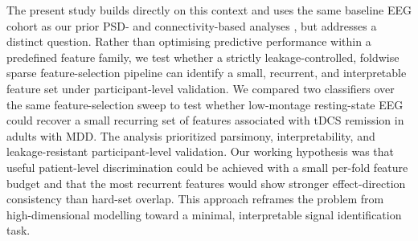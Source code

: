 The present study builds directly on this context and uses the same baseline EEG cohort as our prior PSD- and connectivity-based analyses \citep{Moncy2024,Xiao2025PMIP}, but addresses a distinct question. Rather than optimising predictive performance within a predefined feature family, we test whether a strictly leakage-controlled, foldwise sparse feature-selection pipeline can identify a small, recurrent, and interpretable feature set under participant-level validation. We compared two classifiers over the same feature-selection sweep to test whether low-montage resting-state EEG could recover a small recurring set of features associated with tDCS remission in adults with MDD. The analysis prioritized parsimony, interpretability, and leakage-resistant participant-level validation. Our working hypothesis was that useful patient-level discrimination could be achieved with a small per-fold feature budget and that the most recurrent features would show stronger effect-direction consistency than hard-set overlap. This approach reframes the problem from high-dimensional modelling toward a minimal, interpretable signal identification task.
